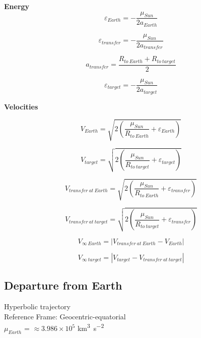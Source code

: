 \documentclass{article}
\begin{document}
\begin{multicols}{2}
	\textbf{Energy}
	\begin{equation*}
	\varepsilon_{Earth} = - \dfrac{\mu_{Sun}}{2 a_{Earth}}
	\end{equation*}

	\begin{equation*}
	\varepsilon_{transfer} = - \dfrac{\mu_{Sun}}{2 a_{transfer}}
	\end{equation*}

	\begin{equation*}
	a_{transfer} = \dfrac{R_{to\ Earth} + R_{to\ target}}{2}
	\end{equation*}

	\begin{equation*}
	\varepsilon_{target} = - \dfrac{\mu_{Sun}}{2 a_{target}}
	\end{equation*}

	\vfill\null
	\columnbreak
	\textbf{Velocities}

	\begin{equation*}
	V_{Earth} = \sqrt{2\left(\dfrac{\mu_{Sun}}{R_{to\ Earth}} + \varepsilon_{Earth}\right)}
	\end{equation*}

	\begin{equation*}
	V_{target} = \sqrt{2\left(\dfrac{\mu_{Sun}}{R_{to\ target}} + \varepsilon_{target}\right)}
	\end{equation*}

	\begin{equation*}
	V_{transfer\ at\ Earth} = \sqrt{2\left(\dfrac{\mu_{Sun}}{R_{to\ Earth}} + \varepsilon_{transfer}\right)}
	\end{equation*}

	\begin{equation*}
	V_{transfer\ at\ target} = \sqrt{2\left(\dfrac{\mu_{Sun}}{R_{to\ target}} + \varepsilon_{transfer}\right)}
	\end{equation*}

	\begin{equation*}
	V_{\infty\ Earth} = |V_{transfer\ at\ Earth} - V_{Earth}|
	\end{equation*}

	\begin{equation*}
	V_{\infty\ target} = |V_{target} - V_{transfer\ at\ target}|
	\end{equation*}
\end{multicols}

\subsection{Departure from Earth}
Hyperbolic trajectory\\
Reference Frame: Geocentric-equatorial\\
$\mu_{Earth}$ = $\approx 3.986 \times 10^{5}$ \si{\kilo\meter\cubed\per\second\squared}\\
\end{document}
